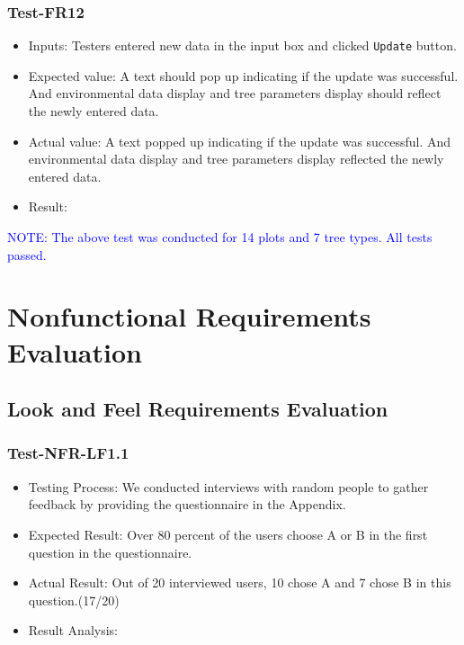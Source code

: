 \documentclass[12pt, titlepage]{article}
\begin{document}
\subsubsection{Test-FR12}
\begin{itemize}
\item Inputs: Testers entered new data in the input box and clicked 
\verb|Update| button.
\item Expected value: A text should pop up indicating if the update was
successful. And environmental data display and tree parameters display
should reflect the newly entered data. 
\item Actual value: A text popped up indicating if the update was successful. And environmental data display and tree parameters display  
reflected the newly entered data.
\item Result: \pass
\end{itemize}
\textcolor{blue}{NOTE: The above test was conducted for 14 plots and 7 tree types. 
All tests passed.}


\newpage

\section{Nonfunctional Requirements Evaluation}

\subsection{Look and Feel Requirements Evaluation}
\subsubsection{Test-NFR-LF1.1}
\begin{itemize}
    \item Testing Process: We conducted interviews with random people to gather feedback by providing the questionnaire in the Appendix.
    \item Expected Result: Over 80 percent of the users choose A or B in the first question in the questionnaire.
    \item Actual Result: Out of 20 interviewed users, 10 chose A and 7 chose B in this question.(17/20)
    \item Result Analysis: \pass  
\end{itemize}
\end{document}
